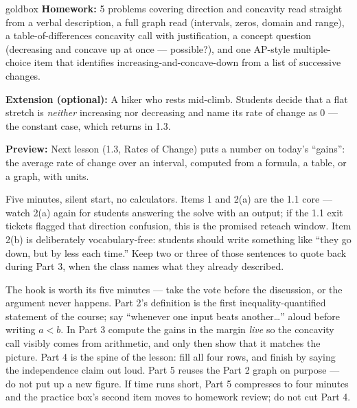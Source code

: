 \documentclass[10pt]{article}
\begin{document}
\begin{skillbox}{goldbox}
\textbf{Homework:} 5 problems covering direction and concavity read straight
from a verbal description, a full graph read (intervals, zeros, domain and
range), a table-of-differences concavity call with justification, a concept
question (decreasing and concave up at once --- possible?), and one AP-style
multiple-choice item that identifies increasing-and-concave-down from a list
of successive changes.

\textbf{Extension (optional):} A hiker who rests mid-climb. Students decide
that a flat stretch is \textit{neither} increasing nor decreasing and name its
rate of change as 0 --- the constant case, which returns in 1.3.

\textbf{Preview:} Next lesson (1.3, Rates of Change) puts a number on today's
``gains'': the average rate of change over an interval, computed from a
formula, a table, or a graph, with units.
\end{skillbox}

\begin{teachernote}[Warm-Up]
Five minutes, silent start, no calculators. Items 1 and 2(a) are the 1.1
core --- watch 2(a) again for students answering the solve with an output; if
the 1.1 exit tickets flagged that direction confusion, this is the promised
reteach window. Item 2(b) is deliberately vocabulary-free: students should
write something like ``they go down, but by less each time.'' Keep two or
three of those sentences to quote back during Part 3, when the class names
what they already described.
\end{teachernote}

\begin{teachernote}
The hook is worth its five minutes --- take the vote before the discussion, or
the argument never happens. Part 2's definition is the first
inequality-quantified statement of the course; say ``whenever one input beats
another\ldots'' aloud before writing $a < b$. In Part 3 compute the gains in
the margin \textit{live} so the concavity call visibly comes from arithmetic,
and only then show that it matches the picture. Part 4 is the spine of the
lesson: fill all four rows, and finish by saying the independence claim out
loud. Part 5 reuses the Part 2 graph on purpose --- do not put up a new
figure. If time runs short, Part 5 compresses to four minutes and the practice
box's second item moves to homework review; do not cut Part 4.
\end{teachernote}
\end{document}
